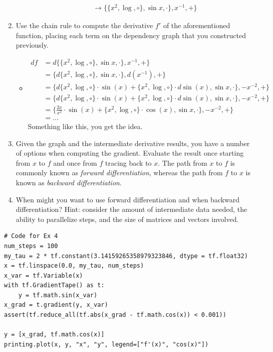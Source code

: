\documentclass{article}
\begin{document}
\begin{enumerate}
\begin{itemize}
$$\begin{aligned}
		&\rightarrow \{\{x^2, \log, \circ\}, \sin x, \cdot\}, x^{-1}, +\}
		\end{aligned}
		$$
	\end{itemize}
\item Use the chain rule to compute the derivative $f'$ of the aforementioned function, placing each term on the dependency graph that you constructed previously.
	\begin{itemize}
		\item
		$$
		\begin{aligned}
		df &= d\{\{x^2, \log, \circ\}, \sin x, \cdot\}, x^{-1}, +\} \\
		&= \{d\{x^2, \log, \circ\}, \sin x, \cdot\}, d(x^{-1}),+\} \\
		&= \{d\{x^2, \log, \circ\} \cdot \sin(x) + \{x^2, \log, \circ\} \cdot d\sin(x), \sin x, \cdot\}, -x^{-2},+\} \\
		&= \{d\{x^2, \log, \circ\} \cdot \sin(x) + \{x^2, \log, \circ\} \cdot d\sin(x), \sin x, \cdot\}, -x^{-2},+\} \\
		&= \{\frac{2x}{x^2} \cdot \sin(x) + \{x^2, \log, \circ\} \cdot \cos(x), \sin x, \cdot\}, -x^{-2},+\} \\
		&= \dots
		\end{aligned}
		$$
		Something like this, you get the idea.
	\end{itemize}
\item Given the graph and the intermediate derivative results, you have a number of options when computing the gradient. Evaluate the result once starting from $x$ to $f$ and once from $f$ tracing back to $x$. The path from $x$ to $f$ is commonly known as \textit{forward differentiation}, whereas the path from $f$ to $x$ is known as \textit{backward differentiation}.
\item When might you want to use forward differentiation and when backward differentiation? Hint: consider the amount of intermediate data needed, the ability to parallelize steps, and the size of matrices and vectors involved.
\end{enumerate}

\begin{verbatim}
# Code for Ex 4
num_steps = 100
my_tau = 2 * tf.constant(3.14159265358979323846, dtype = tf.float32)
x = tf.linspace(0.0, my_tau, num_steps)
x_var = tf.Variable(x)
with tf.GradientTape() as t:
    y = tf.math.sin(x_var)
x_grad = t.gradient(y, x_var)
assert(tf.reduce_all(tf.abs(x_grad - tf.math.cos(x)) < 0.001))

y = [x_grad, tf.math.cos(x)]
printing.plot(x, y, "x", "y", legend=["f'(x)", "cos(x)"])
\end{verbatim}
\end{document}
